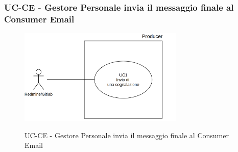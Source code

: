 \subsubsection{UC\theuccount-CE - Gestore Personale invia il messaggio finale al Consumer Email}
	\begin{figure}[H]
		\centering
		\includegraphics[width=0.7\textwidth]{img/UC1.png}\\
		\caption{UC\theuccount-CE - Gestore Personale invia il messaggio finale al Consumer Email}
	\end{figure}
